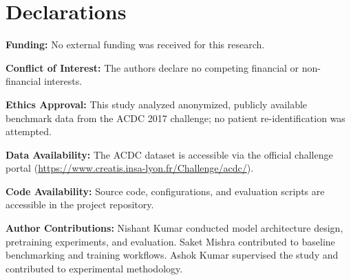 \documentclass[pdflatex,sn-mathphys]{sn-jnl}
\theoremstyle{thmstyleone}
\theoremstyle{thmstyletwo}
\theoremstyle{thmstylethree}
\begin{document}
\section*{Declarations}

\textbf{Funding:} No external funding was received for this research.

\textbf{Conflict of Interest:} The authors declare no competing financial or non-financial interests.

\textbf{Ethics Approval:} This study analyzed anonymized, publicly available benchmark data from the ACDC 2017 challenge; no patient re-identification was attempted.

\textbf{Data Availability:} The ACDC dataset is accessible via the official challenge portal (\url{https://www.creatis.insa-lyon.fr/Challenge/acdc/}).

\textbf{Code Availability:} Source code, configurations, and evaluation scripts are accessible in the project repository.

\textbf{Author Contributions:} Nishant Kumar conducted model architecture design, pretraining experiments, and evaluation. Saket Mishra contributed to baseline benchmarking and training workflows. Ashok Kumar supervised the study and contributed to experimental methodology.


\end{document}
